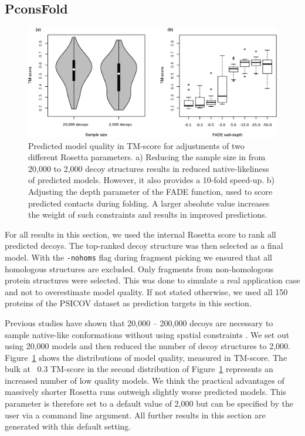 \documentclass{bioinfo}
\begin{document}
\subsection{PconsFold}
\begin{figure}[!tpb]%
\centerline{\includegraphics[scale=0.7]{figures/rosetta.eps}}
\caption{Predicted model quality in TM-score for adjustments of two
  different Rosetta parameters. a) Reducing the sample size in from
  20,000 to 2,000 decoy structures results in reduced
  native-likeliness of predicted models. However, it also provides a
  10-fold speed-up. b) Adjusting the depth parameter of the FADE
  function, used to score predicted contacts during folding. A larger
  absolute value increases the weight of such constraints and results
  in improved predictions.}\label{fig:ros} 
\end{figure}
For all results in this section, we used the internal Rosetta score to
rank all predicted decoys. The top-ranked decoy structure was then
selected as a final model. With the {\tt -nohoms} flag during fragment
picking we ensured that all homologous structures are excluded. Only
fragments from non-homologous protein structures were selected. This
was done to simulate a real application case and not to overestimate
model quality. If not stated otherwise, we used all 150 proteins of
the PSICOV dataset as prediction targets in this section. 

Previous studies have shown that 20,000 -- 200,000 decoys are
necessary to sample native-like conformations without using spatial
constraints \cite[]{Simons10526365}. We set out using 20,000 models
and then reduced the number of decoy structures to
2,000. Figure~\ref{fig:ros} shows the distributions of model quality,
measured in TM-score.  The  bulk at ~0.3 TM-score in the second
distribution of Figure~\ref{fig:ros}  represents an increased
number of low quality models. We think the practical advantages of
massively shorter Rosetta runs outweigh slightly worse predicted
models. This parameter is therefore set to a default value of 2,000
but can be specified by the user via a command line argument. All
further results in this section are generated with this default
setting. 
\end{document}
